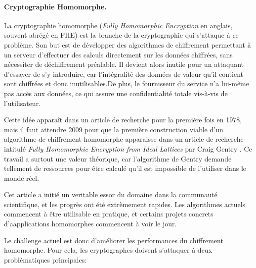 \paragraph{Cryptographie Homomorphe.}
La cryptographie homomorphe (\textit{Fully Homomorphic Encryption} en anglais, souvent abrégé en FHE) est la branche de la cryptographie qui s'attaque à ce problème. Son but est de développer des algorithmes de chiffrement permettant à un serveur d'effectuer des calculs directement sur les données chiffrées, sans nécessiter de déchiffrement préalable. Il devient alors inutile pour un attaquant d'essayer de s'y introduire, car l'intégralité des données de valeur qu'il contient sont chiffrées et donc inutilisables.De plus, le fournisseur du service n'a lui-même pas accès aux données, ce qui assure une confidentialité totale vis-à-vis de l'utilisateur.

Cette idée apparaît dans un article de recherche pour la première fois en 1978, mais il faut attendre 2009 pour que la première construction viable d'un algorithme de chiffrement homomorphe apparaisse dans un article de recherche intitulé \textit{Fully Homomorphic Encryption from Ideal Lattices} par Craig Gentry \cite{STOC:Gentry09}. Ce travail a surtout une valeur théorique, car l'algorithme de Gentry demande tellement de ressources pour être calculé qu'il est impossible de l'utiliser dans le monde réel.

Cet article a initié un veritable essor du domaine dans la communauté scientifique, et les progrès ont été extrèmement rapides. Les algorithmes actuels commencent à être utilisable en pratique, et certains projets concrets d'aapplications homomorphes commencent à voir le jour.

Le challenge actuel est donc d'améliorer les performances du chiffrement homomorphe. Pour cela, les cryptographes doivent s'attaquer à deux problématiques principales:

